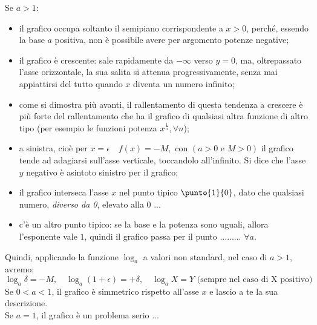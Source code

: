 \begin{minipage}{.4\textwidth}
 \begin{inaccessibleblock}
  \logduebasi
 \end{inaccessibleblock}
\end{minipage}
\hspace{12pt}
\begin{minipage}{.6\textwidth}
Se $a>1$:
\begin{itemize} [noitemsep]
 \item 
il grafico occupa soltanto il semipiano corrispondente a $x>0$, perché,
essendo la base $a$ positiva, non è possibile avere per argomento potenze
negative;
 \item
il grafico è crescente: sale rapidamente da $-\infty$ verso $y=0$, ma, 
oltrepassato
l'asse orizzontale, la sua salita si attenua progressivamente, 
senza mai appiattirsi del tutto quando $x$ diventa un numero infinito; 
 \item 
come si dimostra più avanti, il rallentamento di questa tendenza a crescere
è più forte del rallentamento che ha il grafico di qualsiasi altra
funzione di altro tipo (per esempio le funzioni potenza $x^{\frac{1}{n}}, 
\forall n$);
 \item
a sinistra, cioè 
per $x=\epsilon \quad f(x) = -M, \text{ con } (a>0 \text{ e } M>0)$ 
il grafico tende ad adagiarsi sull'asse verticale, toccandolo all'infinito. 
Si 
dice che l'asse $y$ negativo è asintoto sinistro per il grafico;
 \item
il grafico interseca l'asse $x$ nel punto tipico \(\punto{1}{0}\), dato che 
qualsiasi numero, \emph{diverso da 0}, elevato alla 0 ...
 \item
c'è un altro punto tipico: se la base e la potenza sono uguali, allora 
l'esponente vale $1$, quindi il grafico passa per il punto 
......... $\forall a$.
\end{itemize}

\end{minipage}

Quindi, applicando la funzione $\log_a$ a valori non standard, nel caso di 
$a>1$, avremo: 
\[
 \log_a \delta=-M, \quad \log_a (1+\epsilon)=+\delta,\quad \log_a X=Y 
 \text{ (sempre nel caso di X positivo)}
\]
Se $0<a<1$, il grafico è simmetrico rispetto all'asse $x$ e lascio a te la 
sua descrizione.\\
Se $a=1$, il grafico è un problema serio ...\\

